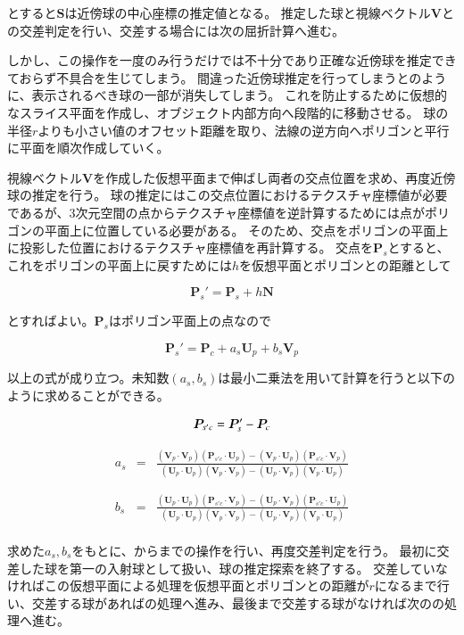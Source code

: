 \noindent
とすると$\bm{S}$は近傍球の中心座標の推定値となる。
推定した球と視線ベクトル$\bm{V}$との交差判定を行い、交差する場合には次の屈折計算へ進む。

しかし、この操作を一度のみ行うだけでは不十分であり正確な近傍球を推定できておらず不具合を生じてしまう。
間違った近傍球推定を行ってしまうと\figref{}のように、表示されるべき球の一部が消失してしまう。
これを防止するために仮想的なスライス平面を作成し、オブジェクト内部方向へ段階的に移動させる\figref{}。
球の半径$r$よりも小さい値のオフセット距離を取り、法線の逆方向へポリゴンと平行に平面を順次作成していく。

視線ベクトル$\bm{V}$を作成した仮想平面まで伸ばし両者の交点位置を求め、再度近傍球の推定を行う。
球の推定にはこの交点位置におけるテクスチャ座標値が必要であるが、3次元空間の点からテクスチャ座標値を逆計算するためには点がポリゴンの平面上に位置している必要がある。
そのため、交点をポリゴンの平面上に投影した位置におけるテクスチャ座標値を再計算する。
交点を$\bm{P}_s$とすると、これをポリゴンの平面上に戻すためには$h$を仮想平面とポリゴンとの距離として

\begin{equation}
\bm{P}_s' = \bm{P}_s + h\bm{N}
\label{EPsdash}
\end{equation}

\noindent
とすればよい。$\bm{P}_s$はポリゴン平面上の点なので

\begin{equation}
\bm{P}_s' = \bm{P}_c + a_s\bm{U}_p + b_s\bm{V}_p 
\label{EPsdash2}
\end{equation}

\noindent
以上の式が成り立つ。未知数$(a_s, b_s)$は最小二乗法を用いて計算を行うと以下のように求めることができる。

\begin{equation}
\bm{P}_{s'c} = \bm{P}_s' - \bm{P}_c\\
\label{EPsdashc}
\end{equation}

\begin{eqnarray}
\label{Eas}
a_s &=& \frac{(\bm{V}_p \cdot \bm{V}_p)(\bm{P}_{s'c} \cdot \bm{U}_p) - (\bm{V}_p \cdot \bm{U}_p)(\bm{P}_{s'c} \cdot \bm{V}_p)}
{(\bm{U}_p \cdot \bm{U}_p)(\bm{V}_p \cdot \bm{V}_p) - (\bm{U}_p \cdot \bm{V}_p)(\bm{V}_p \cdot \bm{U}_p)}\\
\nonumber\\
\nonumber\\
\label{Ebs}
b_s &=& \frac{(\bm{U}_p \cdot \bm{U}_p)(\bm{P}_{s'c} \cdot \bm{V}_p) - (\bm{U}_p \cdot \bm{V}_p)(\bm{P}_{s'c} \cdot \bm{U}_p)}
{(\bm{U}_p \cdot \bm{U}_p)(\bm{V}_p \cdot \bm{V}_p) - (\bm{U}_p \cdot \bm{V}_p)(\bm{V}_p \cdot \bm{U}_p)}
\end{eqnarray}\\
\indent
求めた$a_s, b_s$をもとに、からまでの操作を行い、再度交差判定を行う。
最初に交差した球を第一の入射球として扱い、球の推定探索を終了する。
交差していなければこの仮想平面による処理を仮想平面とポリゴンとの距離が$r$になるまで行い、交差する球があればの処理へ進み、最後まで交差する球がなければ次のの処理へ進む。

